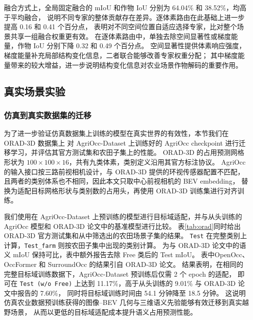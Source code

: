 \documentclass[a4paper,fleqn]{cas-sc}
\begin{document}
融合方式上，全局固定融合的 mIoU 和作物 IoU 分别为 64.04\% 和 38.52\%，均高于平均融合，
说明不同专家的整体贡献存在差异。逐体素路由在此基础上进一步提高 0.16 和 0.41 个百分点，
表明对不同空间位置自适应选择专家，比对整个场景共享一组融合权重更有效。
在逐体素路由中，单独去除空间显著性或梯度能量，作物 IoU 分别下降 0.32 和 0.49 个百分点。
空间显著性提供体素响应强度，梯度能量补充局部结构变化信息，二者联合能够改善专家权重分配；
其中梯度能量带来的较大增益，进一步说明结构变化信息对农业场景作物解码的重要作用。

\subsection{真实场景实验}\label{sec:sim2real}
\subsubsection{仿真到真实数据集的迁移}\label{sec:orad_transfer}
为了进一步验证仿真数据集上训练的模型在真实世界的有效性，本节我们在 ORAD-3D 数据集\citep{chen2025orad3d}上
对 AgriOcc-Dataset 上训练好的 AgriOcc checkpoint 进行迁移学习，并评估其官方测试集和农田子集上的性能。
ORAD-3D 的占用预测网格形状为 $100\times100\times16$，共有九类体素，类别定义沿用其官方标注协议。
AgriOcc 的输入接口按三路前视相机设计，与 ORAD-3D 提供的环视传感器配置不匹配，
且两者的类别体系也不相同，因此本文只取中心前视相机的 BEV embedding，
替换为适配目标网格形状与类别数的占用头，再使用 ORAD-3D 训练集进行对齐训练。

我们使用在 AgriOcc-Dataset 上预训练的模型进行目标域适配，并与从头训练的 AgriOcc 模型和 ORAD-3D 论文中的基准模型进行比较。
表\ref{tab:orad}同时给出 ORAD-3D 官方测试集和从中筛选出的农田场景子集的结果。
\texttt{Test} 在完整类别上计算，\texttt{Test\_farm} 则按农田子集中出现的类别计算。
为与 ORAD-3D 论文中的语义 mIoU 保持可比，表中额外报告去除 Free 类后的 Test mIoU。
表中OpenOcc、OccFormer 和 SurroundOcc 的结果引自 ORAD-3D 论文\citep{chen2025orad3d}。
结果表明，在相同的完整目标域训练数据下，AgriOcc-Dataset 预训练后仅需 2 个 epoch 的适配，
即可在 \texttt{Test (w/o Free)} 上达到 11.17\%，高于从头训练的 9.01\% 与 ORAD-3D 论文中报告的 7.60\%，
同时将目标域训练时间由 54.1 分钟降至 18.5 分钟。
这说明仿真农业数据预训练获得的图像--BEV 几何与三维语义先验能够有效迁移到真实越野场景，
从而以更低的目标域适配成本提升语义占用预测性能。
\end{document}
